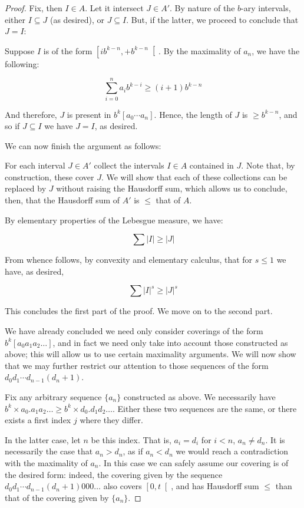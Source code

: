 \documentclass[11pt]{amsart}
\begin{document}
\begin{proof}
Fix, then $I \in A$. Let it intersect $J \in A'$. By nature of the $b$-ary intervals, either $I \subseteq J$ (as desired), or $J \subseteq I$. But, if the latter, we proceed to conclude that $J = I$:

Suppose $I$ is of the form $\left[ i b^{k-n}, +b^{k-n} \right[$. By the maximality of $a_n$, we have the following:

\[ \sum_{i = 0}^n a_i b^{k-i} \geq (i+1) b^{k-n} \]

And therefore, $J$ is present in $b^k [a_0 \cdots a_n]$. Hence, the length of $J$ is $\geq b^{k-n}$, and so if $J \subseteq I$ we have $J = I$, as desired.

We can now finish the argument as follows:

For each interval $J \in A'$ collect the intervals $I \in A$ contained in $J$. Note that, by construction, these cover $J$. We will show that each of these collections can be replaced by $J$ without raising the Hausdorff sum, which allows us to conclude, then, that the Hausdorff sum of $A'$ is $\leq$ that of $A$.

By elementary properties of the Lebesgue measure, we have:

\[ \sum \lvert I \rvert \geq \lvert J \rvert \]

From whence follows, by convexity and elementary calculus, that for $s \leq 1$ we have, as desired,

\[ \sum \lvert I \rvert^s \geq \lvert J \rvert^s \]

This concludes the first part of the proof. We move on to the second part.

We have already concluded we need only consider coverings of the form $b^k [a_0 a_1 a_2 \dots]$, and in fact we need only take into account those constructed as above; this will allow us to use certain maximality arguments. We will now show that we may further restrict our attention to those sequences of the form $d_0 d_1 \cdots d_{n-1} (d_n + 1)$.

Fix any arbitrary sequence $\{a_n\}$ constructed as above. We necessarily have $b^k \times a_0 . a_1 a_2 \dots \geq b^k \times d_0 . d_1 d_2 \dots$. Either these two sequences are the same, or there exists a first index $j$ where they differ.

In the latter case, let $n$ be this index. That is, $a_i = d_i$ for $i < n$, $a_n \neq d_n$. It is necessarily the case that $a_n > d_n$, as if $a_n < d_n$ we would reach a contradiction with the maximality of $a_n$. In this case we can safely assume our covering is of the desired form: indeed, the covering given by the sequence $d_0 d_1 \cdots d_{n-1} (d_n + 1) 0 0 0 \dots$ also covers $\left[0, t \right[$, and has Hausdorff sum $\leq$ than that of the covering given by $\{a_n\}$.


\end{proof}
\end{document}
